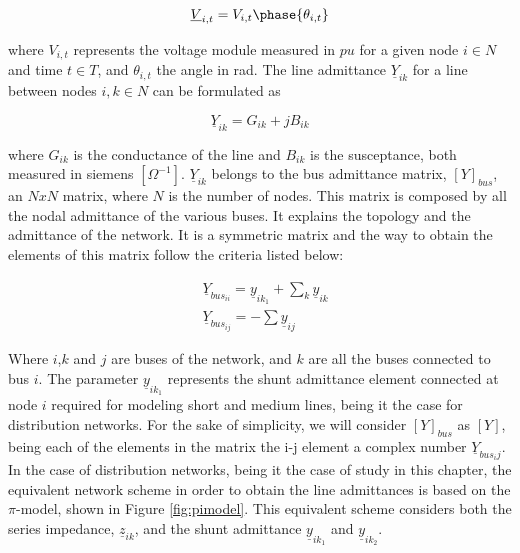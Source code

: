 \begin{equation*}
\underline{V}_{i,t} = V_{i,t} \phase{\theta_{i,t}}
\end{equation*}

where $V_{i,t}$ represents the voltage module measured in $pu$ for a given node $i \in N$ and time $t \in T$, and $\theta_{i,t}$ the angle in rad. The line admittance $\underline{Y}_{ik}$ for a line between nodes $i,k \in N$ can be formulated as

\begin{equation*}
\underline{Y}_{ik} = G_{ik} + jB_{ik}
\end{equation*}

where $G_{ik}$ is the conductance of the line and $B_{ik}$ is the susceptance, both measured in siemens $[\Omega^{-1}]$. $\underline{Y}_{ik}$ belongs to the bus admittance matrix, $[Y]_{bus}$, an $N x N$ matrix, where $N$ is the number of nodes. This matrix is composed by all the nodal admittance of the various buses. It explains the topology and the admittance of the network. It is a symmetric matrix and the way to obtain the elements of this matrix follow the criteria listed below:

\begin{subequations}
\begin{align*}
& \underline{Y}_{bus_{ii}}= \underline{y}_{ik_{1}} + \sum_k \underline{y}_{ik} \\
& \underline{Y}_{bus_{ij}} = - \sum \underline{y}_{ij}
\end{align*}
\end{subequations}

Where $i$,$k$ and $j$ are buses of the network, and $k$ are all the buses connected to bus $i$. The parameter $\underline{y}_{ik_{1}}$ represents the shunt admittance element connected at node $i$ required for modeling short and medium lines, being it the case for distribution networks. For the sake of simplicity, we will consider $[Y]_{bus}$ as $[Y]$, being each of the elements in the matrix the i-j element a complex number $\underline{Y}_{bus_ij}$. In the case of distribution networks, being it the case of study in this chapter, the equivalent network scheme in order to obtain the line admittances is based on the $\pi$-model, shown in Figure \ref{fig:pimodel}. This equivalent scheme considers both the series impedance, $\underline{z}_{ik}$, and the shunt admittance $\underline{y}_{ik_1}$ and $\underline{y}_{ik_2}$.

